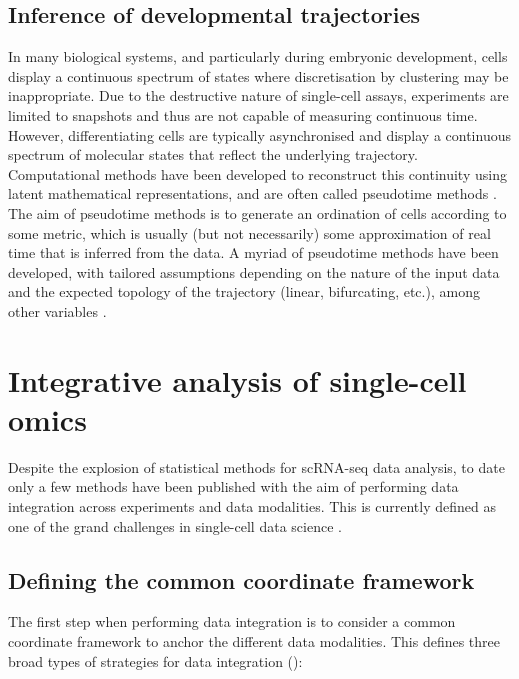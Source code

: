 \subsection{Inference of developmental trajectories}

In many biological systems, and particularly during embryonic development, cells display a continuous spectrum of states where discretisation by clustering may be inappropriate. Due to the destructive nature of single-cell assays, experiments are limited to snapshots and thus are not capable of measuring continuous time. However, differentiating cells are typically asynchronised and display a continuous spectrum of molecular states that reflect the underlying trajectory. Computational methods have been developed to reconstruct this continuity using latent mathematical representations, and are often called pseudotime methods \cite{Saelens2019}. The aim of pseudotime methods is to generate an ordination of cells according to some metric, which is usually (but not necessarily) some approximation of real time that is inferred from the data. A myriad of pseudotime methods have been developed, with tailored assumptions depending on the nature of the input data and the expected topology of the trajectory (linear, bifurcating, etc.), among other variables \cite{Saelens2019}. 

\section{Integrative analysis of single-cell omics}

Despite the explosion of statistical methods for scRNA-seq data analysis, to date only a few methods have been published with the aim of performing data integration across experiments and data modalities. This is currently defined as one of the grand challenges in single-cell data science \cite{Lahnemann2020}.

\subsection{Defining the common coordinate framework}

The first step when performing data integration is to consider a common coordinate framework to anchor the different data modalities. This defines three broad types of strategies for data integration (): 

